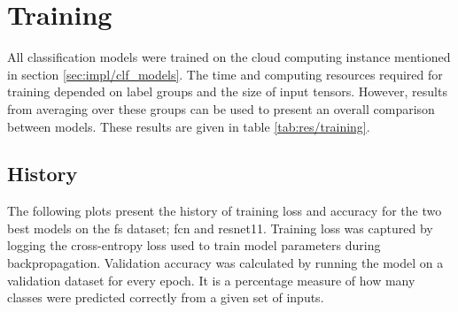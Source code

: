 \section{Training} \label{sec:res/training}

All classification models were trained on the cloud computing instance mentioned in section \ref{sec:impl/clf_models}. The time and computing resources required for training depended on label groups and the size of input tensors. However, results from averaging over these groups can be used to present an overall comparison between models. These results are given in table \ref{tab:res/training}.

\begin{table}[h!]
    \caption{Average time and epochs elapsed during training for all model architectures.}
    \label{tab:res/training}
\end{table}
\FloatBarrier

\subsection{History}

The following plots present the history of training loss and accuracy for the two best models on the \acrshort{fs} dataset; \acrshort{fcn} and \acrshort{resnet11}. Training loss was captured by logging the cross-entropy loss used to train model parameters during backpropagation. Validation accuracy was calculated by running the model on a validation dataset for every epoch. It is a percentage measure of how many classes were predicted correctly from a given set of inputs.


